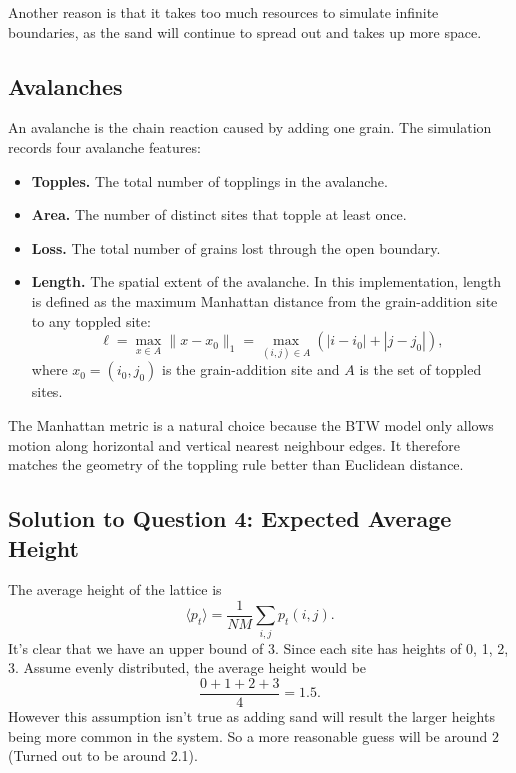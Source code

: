 \documentclass[11pt]{article}
\begin{document}
Another reason is that it takes too much resources to simulate infinite boundaries, as the sand will continue to spread out and takes up more space.
\subsection{Avalanches}

An avalanche is the chain reaction caused by adding one grain. 
The simulation records four avalanche features:

\begin{itemize}
    \item \textbf{Topples.} The total number of topplings in the avalanche.

    \item \textbf{Area.} The number of distinct sites that topple at least once.

    \item \textbf{Loss.} The total number of grains lost through the open boundary.

    \item \textbf{Length.} The spatial extent of the avalanche. 
    In this implementation, length is defined as the maximum Manhattan distance from the grain-addition site to any toppled site:
    \[
        \ell = \max_{x\in A} \|x-x_0\|_1
        =
        \max_{(i,j)\in A} \left(|i-i_0|+|j-j_0|\right),
    \]
    where \(x_0=(i_0,j_0)\) is the grain-addition site and \(A\) is the set of toppled sites.
\end{itemize}

The Manhattan metric is a natural choice because the BTW model only allows motion along horizontal and vertical nearest neighbour edges. 
It therefore matches the geometry of the toppling rule better than Euclidean distance.

\subsection{Solution to Question 4: Expected Average Height}

The average height of the lattice is
\[
    \langle p_t \rangle
    =
    \frac{1}{NM}\sum_{i, j}^{} p_t(i,j).
\]
It's clear that we have an upper bound of 3. Since each site has heights of 0, 1, 2, 3.
Assume evenly distributed, the average height would be
\[
    \frac{0 + 1 + 2 + 3}{4} = 1.5.
\]
However this assumption isn't true as adding sand will result the larger heights being more common in the system. So a more reasonable guess will be around $2$ (Turned out to be around 2.1).
\end{document}
